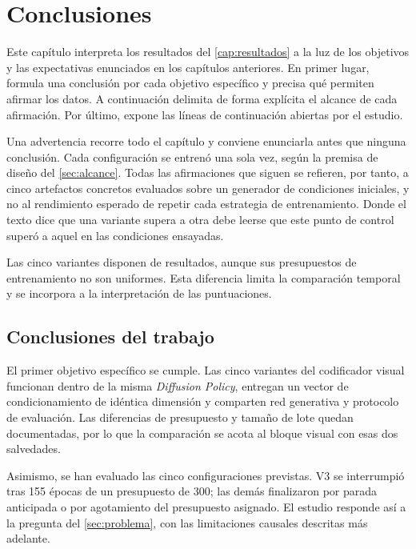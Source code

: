 \chapter{Conclusiones}
\label{cap:conclusiones}

Este cap\'itulo interpreta los resultados del \cref{cap:resultados} a la luz de los
objetivos y las expectativas enunciados en los cap\'itulos anteriores. En primer lugar,
formula una conclusi\'on por cada objetivo espec\'ifico y precisa qu\'e permiten afirmar
los datos. A continuaci\'on delimita de forma expl\'icita el alcance de cada afirmaci\'on.
Por \'ultimo, expone las l\'ineas de continuaci\'on abiertas por el estudio.

Una advertencia recorre todo el cap\'itulo y conviene enunciarla antes que ninguna
conclusi\'on. Cada configuraci\'on se entren\'o una sola vez, seg\'un la premisa de
dise\~no del \cref{sec:alcance}. Todas las afirmaciones que siguen se refieren, por tanto,
a cinco artefactos concretos evaluados sobre un generador de condiciones iniciales, y no
al rendimiento esperado de repetir cada estrategia de entrenamiento. Donde el texto dice
que una variante supera a otra debe leerse que este punto de control super\'o a aquel en
las condiciones ensayadas.

Las cinco variantes disponen de resultados, aunque sus presupuestos de entrenamiento no
son uniformes. Esta diferencia limita la comparaci\'on temporal y se incorpora a la
interpretaci\'on de las puntuaciones.

\section{Conclusiones del trabajo}
\label{sec:conclusiones}


El primer objetivo espec\'ifico se cumple. Las cinco variantes del codificador visual
funcionan dentro de la misma
\textit{Diffusion Policy}, entregan un vector de condicionamiento de id\'entica
dimensi\'on y comparten red generativa y protocolo de evaluaci\'on. Las diferencias de
presupuesto y tama\~no de lote quedan documentadas, por lo que la comparaci\'on se acota al
bloque visual con esas dos salvedades.

Asimismo, se han evaluado las cinco configuraciones previstas. V3 se interrumpi\'o tras
\num{155} \'epocas de un presupuesto de \num{300}; las dem\'as finalizaron por parada
anticipada o por agotamiento del presupuesto asignado. El estudio responde as\'i a la
pregunta del \cref{sec:problema}, con las limitaciones causales descritas m\'as adelante.

